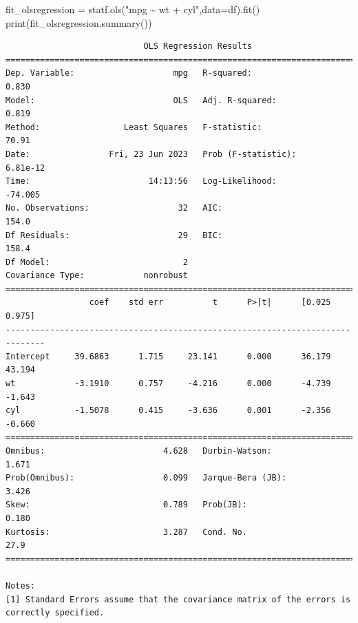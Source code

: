 \documentclass[
  letterpaper,
  DIV=11,
  numbers=noendperiod]{scrreprt}
\newenvironment{Shaded}{\begin{snugshade}}{\end{snugshade}}
\newcommand{\BuiltInTok}[1]{\textcolor[rgb]{0.00,0.23,0.31}{#1}}
\newcommand{\NormalTok}[1]{\textcolor[rgb]{0.00,0.23,0.31}{#1}}
\newcommand{\OperatorTok}[1]{\textcolor[rgb]{0.37,0.37,0.37}{#1}}
\newcommand{\StringTok}[1]{\textcolor[rgb]{0.13,0.47,0.30}{#1}}
\begin{document}
\begin{Shaded}
\begin{Highlighting}[]
\NormalTok{fit\_olsregression }\OperatorTok{=}\NormalTok{ statf.ols(}\StringTok{"mpg \textasciitilde{} wt + cyl"}\NormalTok{,data}\OperatorTok{=}\NormalTok{df).fit()}
\BuiltInTok{print}\NormalTok{(fit\_olsregression.summary())}
\end{Highlighting}
\end{Shaded}

\begin{verbatim}
                            OLS Regression Results                            
==============================================================================
Dep. Variable:                    mpg   R-squared:                       0.830
Model:                            OLS   Adj. R-squared:                  0.819
Method:                 Least Squares   F-statistic:                     70.91
Date:                Fri, 23 Jun 2023   Prob (F-statistic):           6.81e-12
Time:                        14:13:56   Log-Likelihood:                -74.005
No. Observations:                  32   AIC:                             154.0
Df Residuals:                      29   BIC:                             158.4
Df Model:                           2                                         
Covariance Type:            nonrobust                                         
==============================================================================
                 coef    std err          t      P>|t|      [0.025      0.975]
------------------------------------------------------------------------------
Intercept     39.6863      1.715     23.141      0.000      36.179      43.194
wt            -3.1910      0.757     -4.216      0.000      -4.739      -1.643
cyl           -1.5078      0.415     -3.636      0.001      -2.356      -0.660
==============================================================================
Omnibus:                        4.628   Durbin-Watson:                   1.671
Prob(Omnibus):                  0.099   Jarque-Bera (JB):                3.426
Skew:                           0.789   Prob(JB):                        0.180
Kurtosis:                       3.287   Cond. No.                         27.9
==============================================================================

Notes:
[1] Standard Errors assume that the covariance matrix of the errors is correctly specified.
\end{verbatim}
\end{document}
